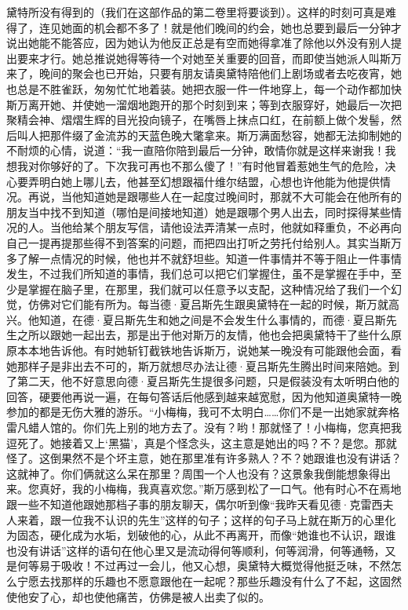 黛特所没有得到的（我们在这部作品的第二卷里将要谈到）。这样的时刻可真是难得了，连见她面的机会都不多了！就是他们晚间的约会，她也总要到最后一分钟才说出她能不能答应，因为她认为他反正总是有空而她得拿准了除他以外没有别人提出要来才行。她总推说她得等待一个对她至关重要的回音，而即使当她派人叫斯万来了，晚间的聚会也已开始，只要有朋友请奥黛特陪他们上剧场或者去吃夜宵，她也总是不胜雀跃，匆匆忙忙地着装。她把衣服一件一件地穿上，每一个动作都加快斯万离开她、并使她一溜烟地跑开的那个时刻到来；等到衣服穿好，她最后一次把聚精会神、熠熠生辉的目光投向镜子，在嘴唇上抹点口红，在前额上做个发髻，然后叫人把那件缀了金流苏的天蓝色晚大氅拿来。斯万满面愁容，她都无法抑制她的不耐烦的心情，说道：“我一直陪你陪到最后一分钟，敢情你就是这样来谢我！我想我对你够好的了。下次我可再也不那么傻了！”有时他冒着惹她生气的危险，决心要弄明白她上哪儿去，他甚至幻想跟福什维尔结盟，心想也许他能为他提供情况。再说，当他知道她是跟哪些人在一起度过晚间时，那就不大可能会在他所有的朋友当中找不到知道（哪怕是间接地知道）她是跟哪个男人出去，同时探得某些情况的人。当他给某个朋友写信，请他设法弄清某一点时，他就如释重负，不必再向自己一提再提那些得不到答案的问题，而把四出打听之劳托付给别人。其实当斯万多了解一点情况的时候，他也并不就舒坦些。知道一件事情并不等于阻止一件事情发生，不过我们所知道的事情，我们总可以把它们掌握住，虽不是掌握在手中，至少是掌握在脑子里，在那里，我们就可以任意予以支配，这种情况给了我们一个幻觉，仿佛对它们能有所为。每当德·夏吕斯先生跟奥黛特在一起的时候，斯万就高兴。他知道，在德·夏吕斯先生和她之间是不会发生什么事情的，而德·夏吕斯先生之所以跟她一起出去，那是出于他对斯万的友情，他也会把奥黛特干了些什么原原本本地告诉他。有时她斩钉截铁地告诉斯万，说她某一晚没有可能跟他会面，看她那样子是非出去不可的，斯万就想尽办法让德·夏吕斯先生腾出时间来陪她。到了第二天，他不好意思向德·夏吕斯先生提很多问题，只是假装没有太听明白他的回答，硬要他再说一遍，在每句答话后他感到越来越宽慰，因为他知道奥黛特一晚参加的都是无伤大雅的游乐。“小梅梅，我可不太明白……你们不是一出她家就奔格雷凡蜡人馆的。你们先上别的地方去了。没有？哟！那就怪了！小梅梅，您真把我逗死了。她接着又上‘黑猫’，真是个怪念头，这主意是她出的吗？不？是您。那就怪了。这倒果然不是个坏主意，她在那里准有许多熟人？不？她跟谁也没有讲话？这就神了。你们俩就这么呆在那里？周围一个人也没有？这景象我倒能想象得出来。您真好，我的小梅梅，我真喜欢您。”斯万感到松了一口气。他有时心不在焉地跟一些不知道他跟她那档子事的朋友聊天，偶尔听到像“我昨天看见德·克雷西夫人来着，跟一位我不认识的先生”这样的句子；这样的句子马上就在斯万的心里化为固态，硬化成为水垢，划破他的心，从此不再离开，而像“她谁也不认识，跟谁也没有讲话”这样的语句在他心里又是流动得何等顺利，何等润滑，何等通畅，又是何等易于吸收！不过再过一会儿，他又心想，奥黛特大概觉得他挺乏味，不然怎么宁愿去找那样的乐趣也不愿意跟他在一起呢？那些乐趣没有什么了不起，这固然使他安了心，却也使他痛苦，仿佛是被人出卖了似的。
